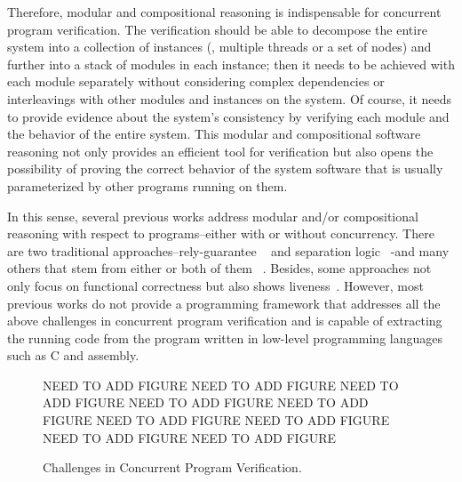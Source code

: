 
Therefore, modular and compositional reasoning is indispensable for concurrent program verification. 
The verification should be able to decompose the entire system into a collection of instances (\ie, multiple threads or a set of nodes) and 
further into a stack of modules in each instance; then it needs to be achieved with each module separately without considering complex 
dependencies or interleavings with other modules and instances on the system. Of course, it needs to provide evidence about the system's 
consistency by verifying each module and the behavior of the entire system. 
This modular and compositional software reasoning not only provides an efficient tool for verification 
but also opens the possibility of proving the correct behavior of the system software that is usually parameterized by other programs running on them.
%

In this sense, several previous works address modular and/or compositional reasoning with respect to programs--either with or without concurrency.
There are two traditional approaches--rely-guarantee ~\cite{jones83} and separation logic ~\cite{ishtiaq01}-and many others 
that stem from either or both of them 
~\cite{feng07:sagl,vafeiadis:marriage,LRG,fu10:roch,sergey15, lili16,Vafeiadis11mfps, Yang07relsep,
Liang14lics}.
Besides, some approaches not only focus on functional correctness but also shows liveness~\cite{lili16}.
However, most previous works do not provide a programming framework that addresses all the above challenges
in concurrent program verification and is capable of extracting the running code from the program written in low-level programming 
languages such as C and assembly.



\begin{figure}
\begin{center}

NEED TO ADD FIGURE
NEED TO ADD FIGURE
NEED TO ADD FIGURE
NEED TO ADD FIGURE
NEED TO ADD FIGURE
NEED TO ADD FIGURE
NEED TO ADD FIGURE
NEED TO ADD FIGURE
NEED TO ADD FIGURE
\end{center}

\caption{Challenges in Concurrent Program Verification.}
\label{fig:intro:challenges-concurrent-prog-verification}
\end{figure}


